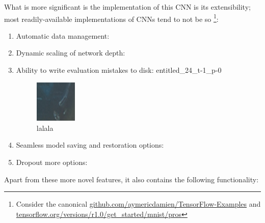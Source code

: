 \documentclass[a4paper, 11pt]{article} %
\begin{document}
	What is more significant is the implementation of this CNN is its 
	extensibility; most readily-available implementations of CNNs tend to not 
	be so \footnote{Consider the canonical
	\hyperlink{https://github.com/aymericdamien/TensorFlow-Examples}
	{github.com/aymericdamien/TensorFlow-Examples} and 
	\hyperlink{https://www.tensorflow.org/versions/r1.0/get\_started/mnist/pros}
	{tensorflow.org/versions/r1.0/get\_started/mnist/pros}}:
	\begin{enumerate}
		\item Automatic data management:
		\item Dynamic scaling of network depth:
		\item Ability to write evaluation mistakes to disk: 
		entitled\_24\_t-1\_p-0
		\begin{figure}[H]
			\centering
			\includegraphics[width=2cm]{figures/mistake_example}
			\caption{lalala}
		\end{figure}
		\item Seamless model saving and restoration options:
		\item Dropout more options: \cite{dropout}\relax 
	\end{enumerate}
	Apart from these more novel features, it also contains the following 
	functionality:
\end{document}
